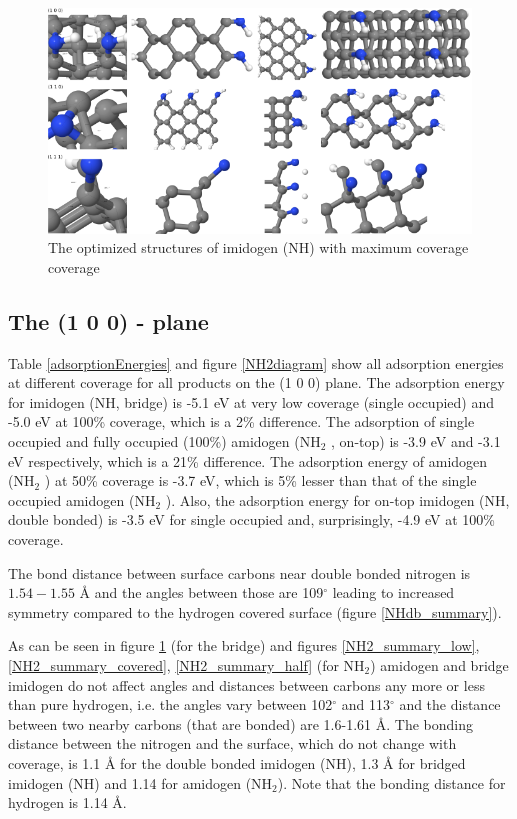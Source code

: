 \documentclass[10pt,a4paper]{article}
\begin{document}
\begin{figure} \captionsetup{width=.8\linewidth} \caption{The optimized structures of imidogen (NH) with maximum coverage coverage} \label{NHbridge_summary}
%
\includegraphics[width=.8\linewidth]{pictures/NHbridge_summary.png}
\end{figure}


\subsection{The (1 0 0) - plane}
Table \ref{adsorptionEnergies} and figure \ref{NH2diagram} show all adsorption energies at different coverage for all products on the (1 0 0) plane. The adsorption energy for imidogen (NH, bridge) is -5.1 eV at very low coverage (single occupied) and -5.0 eV at 100\% coverage, which is a 2\% difference. The adsorption of single occupied and fully occupied (100\%) amidogen (NH$_2$ , on-top) is -3.9 eV and -3.1 eV respectively, which is a 21\% difference. The adsorption energy of amidogen (NH$_2$ ) at 50\% coverage is -3.7 eV, which is 5\% lesser than that of the single occupied amidogen (NH$_2$ ). Also, the adsorption energy for on-top imidogen (NH, double bonded) is -3.5 eV for single occupied and, surprisingly, -4.9 eV at 100\% coverage. 

The bond distance between surface carbons near double bonded nitrogen is $1.54-1.55$ Å and the angles between those are 109$^{\circ}$ leading to increased symmetry compared to the hydrogen covered surface (figure \ref{NHdb_summary}).

As can be seen in figure \ref{NHbridge_summary} (for the bridge) and figures \ref{NH2_summary_low},   \ref{NH2_summary_covered}, \ref{NH2_summary_half} (for NH$_2$) amidogen and bridge imidogen do not affect angles and distances between carbons  any more or less than pure hydrogen, i.e. the angles vary between 102$^{\circ}$ and 113$^{\circ}$ and the distance between two nearby carbons (that are bonded) are 1.6-1.61 Å.  The bonding distance between the nitrogen and the surface, which do not change with coverage, is 1.1 Å for the double bonded imidogen (NH), 1.3 Å for bridged imidogen (NH) and 1.14 for amidogen (NH$_2$). Note that the bonding distance for hydrogen is 1.14 Å.
\end{document}
